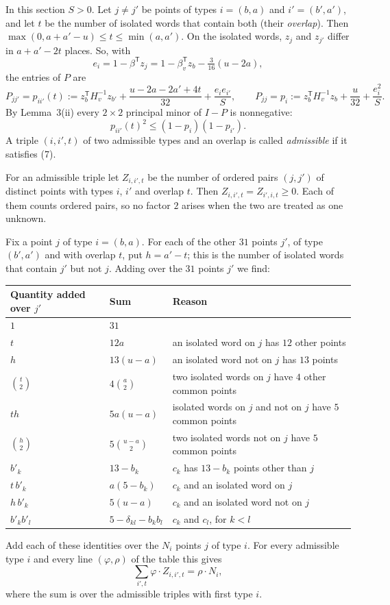 \documentclass[11pt,a4paper]{article}
\newcommand{\T}{^{\mathsf T}}
\begin{document}
In this section $S>0$. Let $j\ne j'$ be points of types $i=(b,a)$ and
$i'=(b',a')$, and let $t$ be the number of isolated words that contain both
(their \emph{overlap}). Then $\max(0,a+a'-u)\le t\le\min(a,a')$. On the
isolated words, $z_j$ and $z_{j'}$ differ in $a+a'-2t$ places. So, with
\[
e_i=1-\beta\T z_j=1-\beta_v\T z_b-\tfrac3{16}(u-2a),
\]
the entries of $P$ are
\[
P_{jj'}=p_{ii'}(t):=z_b\T H_v^{-1}z_{b'}+\frac{u-2a-2a'+4t}{32}
+\frac{e_ie_{i'}}S,\qquad
P_{jj}=p_i:=z_b\T H_v^{-1}z_b+\frac u{32}+\frac{e_i^2}S .
\]
By Lemma~3(ii) every $2\times2$ principal minor of $I-P$ is nonnegative:
\begin{equation}
p_{ii'}(t)^2\le(1-p_i)(1-p_{i'}). \tag{7}
\end{equation}
A triple $(i,i',t)$ of two admissible types and an overlap is called
\emph{admissible} if it satisfies (7).

For an admissible triple let $Z_{i,i',t}$ be the number of ordered pairs
$(j,j')$ of distinct points with types $i$, $i'$ and overlap $t$. Then
$Z_{i,i',t}=Z_{i',i,t}\ge 0$. Each of them counts ordered pairs, so no
factor $2$ arises when the two are treated as one unknown.

Fix a point $j$ of type $i=(b,a)$. For each of the other $31$ points $j'$,
of type $(b',a')$ and with overlap $t$, put $h=a'-t$; this is the number of
isolated words that contain $j'$ but not $j$. Adding over the $31$ points
$j'$ we find:
\begin{center}\small
\begin{tabular}{lll}
\hline
Quantity added over $j'$ & Sum & Reason \\
\hline
$1$ & $31$ & \\
$t$ & $12a$ & an isolated word on $j$ has $12$ other points \\
$h$ & $13(u-a)$ & an isolated word not on $j$ has $13$ points \\
$\binom t2$ & $4\binom a2$ & two isolated words on $j$ have $4$ other common points \\
$th$ & $5a(u-a)$ & isolated words on $j$ and not on $j$ have $5$ common points \\
$\binom h2$ & $5\binom{u-a}2$ & two isolated words not on $j$ have $5$ common points \\
$b'_k$ & $13-b_k$ & $c_k$ has $13-b_k$ points other than $j$ \\
$t\,b'_k$ & $a(5-b_k)$ & $c_k$ and an isolated word on $j$ \\
$h\,b'_k$ & $5(u-a)$ & $c_k$ and an isolated word not on $j$ \\
$b'_kb'_l$ & $5-\delta_{kl}-b_kb_l$ & $c_k$ and $c_l$, for $k<l$ \\
\hline
\end{tabular}
\end{center}
Add each of these identities over the $N_i$ points $j$ of type $i$. For
every admissible type $i$ and every line $(\varphi,\rho)$ of the table
this gives
\begin{equation}
\sum_{i',t}\varphi\cdot Z_{i,i',t}=\rho\cdot N_i , \tag{8}
\end{equation}
where the sum is over the admissible triples with first type $i$.
\end{document}
